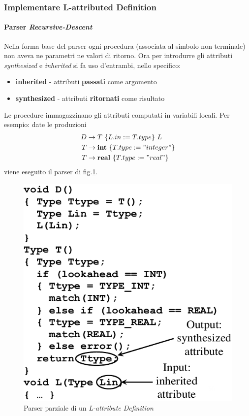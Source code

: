 \subsubsection{Implementare L-attributed Definition}
\paragraph{Parser \textit{Recursive-Descent}}
Nella forma base del parser ogni procedura (associata al simbolo non-terminale)
non aveva ne parametri ne valori di ritorno. Ora per introdurre gli attributi
\textit{synthesized} e \textit{inherited} si fa uso d'entrambi, nello specifico:
\begin{itemize}
\item \textbf{inherited} - attributi \textbf{passati} come argomento
\item \textbf{synthesized} - attributi \textbf{ritornati} come risultato
\end{itemize}

Le procedure immagazzinano gli attributi computati in variabili locali. Per
esempio: date le produzioni
\begin{align*}
D &\to T \ \{L.in:=T.type\} \ L             \\
T &\to \mathbf{int} \ \{T.type:="integer"\} \\
T &\to \mathbf{real} \ \{T.type:="real"\}
\end{align*}
viene eseguito il parser di fig.\ref{img:parser_Lattribute}.

\begin{figure}[H]
  \centering
  \includegraphics[scale=0.4]{res/image/parser_Lattributed}
  \caption{Parser parziale di un \textit{L-attribute Definition}}
  \label{img:parser_Lattribute}
\end{figure}

